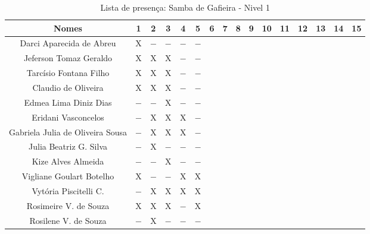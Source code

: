 \documentclass[a4paper,12pt]{article}
\begin{document}
\begin{landscape}

\begin{table}[!htbp]
\vspace*{-2cm}\centering
\caption{Lista de presença: Samba de Gafieira - Nivel 1}
\begin{tabular}{|*{16}{c|}}
\hline%
 Nomes & 1 & 2 & 3 & 4 & 5 & 6 & 7 & 8 & 9 & 10 & 11 & 12 & 13 & 14 & 15  \\ \hline
 
 \LARGE Darci Aparecida de Abreu           &X   &$-$ &$-$ &$-$  &$-$  &  &  &  &  &  &  &  &  &  &  \\ \hline
 \LARGE Jeferson Tomaz Geraldo             &X   &X   &X   &$-$  &$-$  &  &  &  &  &  &  &  &  &  &  \\ \hline
 \LARGE Tarcísio Fontana Filho             &X   &X   &X   &$-$  &$-$  &  &  &  &  &  &  &  &  &  &  \\ \hline
 
 \LARGE Claudio de Oliveira                &X   &X   &X   &$-$  &$-$  &  &  &  &  &  &  &  &  &  &  \\ \hline
 \LARGE Edmea Lima Diniz Dias              &$-$ &$-$ &X   &$-$  &$-$  &  &  &  &  &  &  &  &  &  &  \\ \hline
 \LARGE Eridani Vasconcelos                &$-$ &X   &X   &X    &$-$  &  &  &  &  &  &  &  &  &  &  \\ \hline
 \LARGE Gabriela Julia de Oliveira Sousa   &$-$ &X   &X   &X    &$-$  &  &  &  &  &  &  &  &  &  &  \\ \hline
 \LARGE Julia Beatriz G. Silva             &$-$ &X   &$-$ &$-$  &$-$  &  &  &  &  &  &  &  &  &  &  \\ \hline
 \LARGE Kize Alves Almeida                 &$-$ &$-$ &X   &$-$  &$-$  &  &  &  &  &  &  &  &  &  &  \\ \hline
 \LARGE Vigliane Goulart Botelho           &X   &$-$ &$-$ &X    &X    &  &  &  &  &  &  &  &  &  &  \\ \hline
 \LARGE Vytória Piscitelli C.              &$-$ &X   &X   &X    &X    &  &  &  &  &  &  &  &  &  &  \\ \hline
 \LARGE Rosimeire V. de Souza              &X   &X   &X   &$-$  &X    &  &  &  &  &  &  &  &  &  &  \\ \hline
 \LARGE Rosilene V. de Souza               &$-$ &X   &$-$ &$-$  &$-$  &  &  &  &  &  &  &  &  &  &  \\ \hline
 
 \hline
\end{tabular}
\label{actividades}
\end{table}


\end{landscape}
\end{document}
